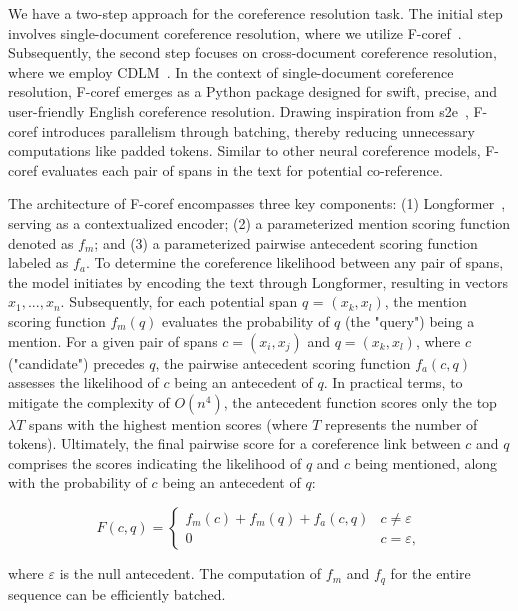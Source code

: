 We have a two-step approach for the coreference resolution task. The initial step involves single-document coreference resolution, where we utilize F-coref~\cite{otmazgin2022fcoref}. Subsequently, the second step focuses on cross-document coreference resolution, where we employ CDLM~\cite{caciularu-etal-2021-cdlm-cross}. In the context of single-document coreference resolution, F-coref emerges as a Python package designed for swift, precise, and user-friendly English coreference resolution. Drawing inspiration from s2e~\cite{kirstain-etal-2021-coreference}, F-coref introduces parallelism through batching, thereby reducing unnecessary computations like padded tokens. Similar to other neural coreference models, F-coref evaluates each pair of spans in the text for potential co-reference.

The architecture of F-coref encompasses three key components: (1) Longformer~\cite{beltagy2020longformer}, serving as a contextualized encoder; (2) a parameterized mention scoring function denoted as $f_m$; and (3) a parameterized pairwise antecedent scoring function labeled as $f_a$. To determine the coreference likelihood between any pair of spans, the model initiates by encoding the text through Longformer, resulting in vectors $x_1,...,x_n$. Subsequently, for each potential span $q$ = $(x_k, x_l)$, the mention scoring function $f_m(q)$ evaluates the probability of $q$ (the "query") being a mention. For a given pair of spans $c = (x_i, x_j)$ and $q = (x_k, x_l)$, where $c$ ("candidate") precedes $q$, the pairwise antecedent scoring function $f_a(c, q)$ assesses the likelihood of $c$ being an antecedent of $q$. In practical terms, to mitigate the complexity of $O(n^4)$, the antecedent function scores only the top $\lambda T$ spans with the highest mention scores (where $T$ represents the number of tokens). Ultimately, the final pairwise score for a coreference link between $c$ and $q$ comprises the scores indicating the likelihood of $q$ and $c$ being mentioned, along with the probability of $c$ being an antecedent of $q$:

\begin{equation}
  F(c,q) =
    \begin{cases}
      f_m(c)+f_m(q)+f_a(c,q) & \text{$c \neq \varepsilon$}\\
      0 & \text{$c = \varepsilon$},
    \end{cases}       
\end{equation}

where $\varepsilon$ is the null antecedent. The computation of $f_m$ and $f_q$ for the entire sequence can be efficiently batched.

